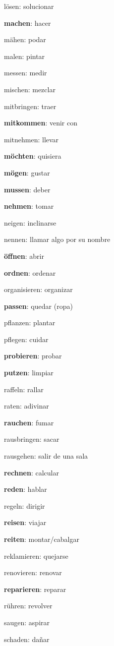 \begin{multicols}{2}
\begin{myitemize}
\item lösen: solucionar
\item \textbf{machen}: hacer
\item mähen: podar
\item malen: pintar
\item messen: medir
\item mischen: mezclar
\item mitbringen: traer
\item \textbf{mitkommen}: venir con
\item mitnehmen: llevar
\item \textbf{möchten}: quisiera
\item \textbf{mögen}: gustar
\item \textbf{mussen}: deber
\item \textbf{nehmen}: tomar
\item neigen: inclinarse
\item nennen: llamar algo por su nombre
\item \textbf{öffnen}: abrir
\item \textbf{ordnen}: ordenar
\item organisieren: organizar
\item \textbf{passen}: quedar (ropa)
\item pflanzen: plantar
\item pflegen: cuidar
\item \textbf{probieren}: probar
\item \textbf{putzen}: limpiar
\item raffeln: rallar
\item raten: adivinar
\item \textbf{rauchen}: fumar
\item rausbringen: sacar
\item rausgehen: salir de una sala
\item \textbf{rechnen}: calcular
\item \textbf{reden}: hablar
\item regeln: dirigir
\item \textbf{reisen}: viajar
\item \textbf{reiten}: montar/cabalgar
\item reklamieren: quejarse
\item renovieren: renovar
\item \textbf{reparieren}: reparar
\item rühren: revolver
\item saugen: aspirar
\item schaden: dañar

\end{myitemize}
\end{multicols}

